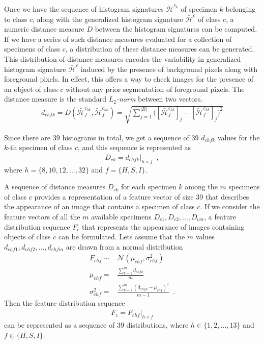 \documentclass {udthesis}
\begin{document}
Once we have the sequence of histogram signatures $\ddot{\mathcal{H}}^{c_{k}}$ of specimen $k$ belonging to class $c$, along with the generalized histogram signature $\bar{\mathcal{H}}^{c}$ of class $c$, a numeric distance measure $D$ between the histogram signatures can be computed. If we have a series of such distance measures evaluated for a collection of specimens of class $c$, a distribution of these distance measures can be generated. This distribution 
of distance measures encodes the variability in generalized histogram signature $\bar{\mathcal{H}}^{c}$ induced by the presence of background pixels along with foreground pixels. In effect, this offers a way to check images for the presence of an object of class $c$ without any prior segmentation of foreground pixels. The distance measure is the standard \emph{$L_2$-norm} between two vectors.
%
\begin{align}	\label{eqn:hist_signature_dist}
 d_{chfk} = D(\bar{\mathcal{H}}^{c_{hk}}_f, \ddot{\mathcal{H}}^{c_{hk}}_f) 
 = \sqrt{\sum_{j=1}^{|B|}\Bigg(\left[\bar{\mathcal{H}}^{c_{hk}}_f\right]_j
 -\left[\ddot{\mathcal{H}}^{c_{hk}}_f\right]_j\Bigg)^2}
\end{align}

Since there are 39 histograms in total, we get a sequence of 39 $d_{chfk}$ values for the $k$-th specimen of class $c$, and this sequence is represented as
%
\begin{align}	\label{eqn:dist_sequence}
 D_{ck}=d_{chfk}\Big|_{h\times f}\enspace ,
\end{align}
%
where $h=\{8,10,12, \ldots,32\}$ and $f=\{H,S,I\}$.

A sequence of distance measures $D_{ck}$ for each specimen $k$ among the $m$ specimens of class $c$ provides a representation of a feature vector of size 39 that describes the appearance of an image that contains a specimen of class $c$. If we consider the feature vectors of all the $m$ available specimens $D_{c1},D_{c2},\ldots,D_{cm}$, a feature distribution sequence $F_c$ that represents the appearance of images containing objects of class $c$ can be formulated. Lets assume that the $m$ values $d_{chf1}, d_{chf2},\ldots,d_{chfm}$ are drawn from a normal distribution 
%
\begin{align}
 F_{chf}\sim &\mathcal{N}(\mu_{chf},\sigma^2_{chf})\label{eqn:normal_distr}\\
 \mu_{chf}= &\frac{\sum_{k=1}^m d_{chfk}}{m}\label{eqn:normal_mean}\\
 \sigma^2_{chf}= &\frac{\sum_{k=1}^m (d_{chfk}-\mu_{chf})^2}{m-1}\label{eqn:normal_stddev}\enspace .
\end{align}
%
Then the feature distribution sequence
\begin{align}	\label{eqn:feat_distribution}
 F_c=F_{chf}\Big|_{h \times f}
\end{align}
can be represented as a sequence of 39 distributions,
where $h\in\{1,2,\ldots,13\}$ and $f\in\{H,S,I\}$. 
\end{document}
